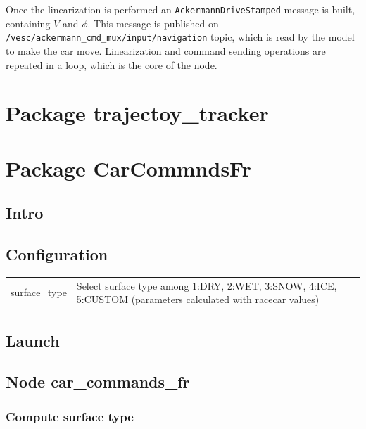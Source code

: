 \documentclass[12pt, letterpaper]{report}
\begin{document}
Once the linearization is performed an \verb|AckermannDriveStamped| message is built, containing $V$ and $\phi$. This message is published on \\ \verb|/vesc/ackermann_cmd_mux/input/navigation| topic, which is read by the model to make the car move. Linearization and command sending operations are repeated in a loop, which is the core of the node.

\newpage

\section{Package trajectoy\_tracker}


\section{Package CarCommndsFr}

\subsection{Intro}

\subsection{Configuration}

\begin{center}
	\begin{tabularx}{\textwidth}{
			| >{\raggedright\arraybackslash}X
			| >{\arraybackslash}X |
		}
		\hline
		\multicolumn{2}{|c|}{\textbf{Surface Parameters}} \\
		\hline
		surface\_type & Select surface type among 1:DRY, 2:WET, 3:SNOW, 4:ICE, 5:CUSTOM (parameters calculated with racecar values) \\
		\hline
	\end{tabularx}
\end{center}

\subsection{Launch}

\subsection{Node car\_commands\_fr}

\subsubsection{Compute surface type}
\end{document}
